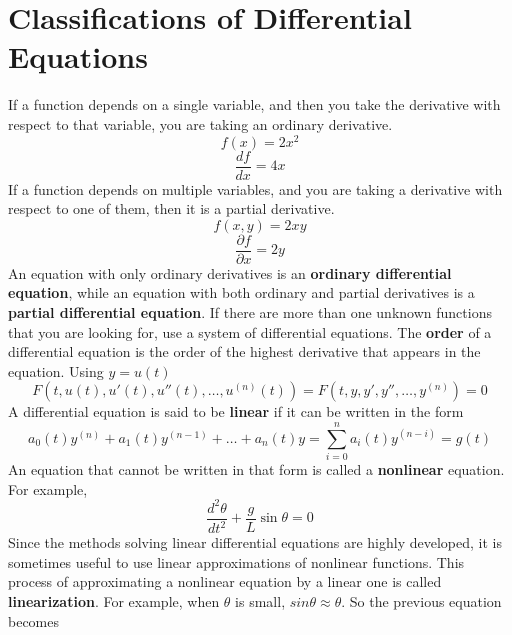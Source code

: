 \section{Classifications of Differential Equations}
    If a function depends on a single variable, and then you take the derivative with respect to that variable, you are taking an ordinary derivative.
    \begin{equation*}
        f(x) = 2x^2
    \end{equation*}
    \begin{equation*}
        \frac{df}{dx} = 4x
    \end{equation*}
    If a function depends on multiple variables, and you are taking a derivative with respect to one of them, then it is a partial derivative.
    \begin{equation*}
        f(x, y) = 2xy
    \end{equation*}
    \begin{equation*}
        \frac{\partial f}{\partial x} = 2y
    \end{equation*}
    An equation with only ordinary derivatives is an \textbf{ordinary differential equation}, while an equation with both ordinary and partial derivatives is a \textbf{partial differential equation}.
    \newline \newline
    If there are more than one unknown functions that you are looking for, use a system of differential equations.
    \newline \newline
    The \textbf{order} of a differential equation is the order of the highest derivative that appears in the equation. Using $y = u(t)$
    \begin{equation*}
        F(t, u(t), u'(t), u''(t), \dots, u^{(n)}(t)) = F(t, y, y', y'', \dots, y^{(n)}) = 0
    \end{equation*}
    A differential equation is said to be \textbf{linear} if it can be written in the form
    \begin{equation*}
        a_0(t)y^{(n)} + a_1(t)y^{(n - 1)} + \dots + a_n(t)y = \sum_{i=0}^{n} a_i(t)y^{(n-i)} = g(t)
    \end{equation*}
    An equation that cannot be written in that form is called a \textbf{nonlinear} equation. For example,
    \begin{equation*}
        \frac{d^2\theta}{dt^2} + \frac{g}{L} \sin \theta = 0
    \end{equation*}
    Since the methods solving linear differential equations are highly developed, it is sometimes useful to use linear approximations of nonlinear functions. This process of approximating a nonlinear equation by a linear one is called \textbf{linearization}. For example, when $\theta$ is small, $sin \theta \approx \theta$. So the previous equation becomes
